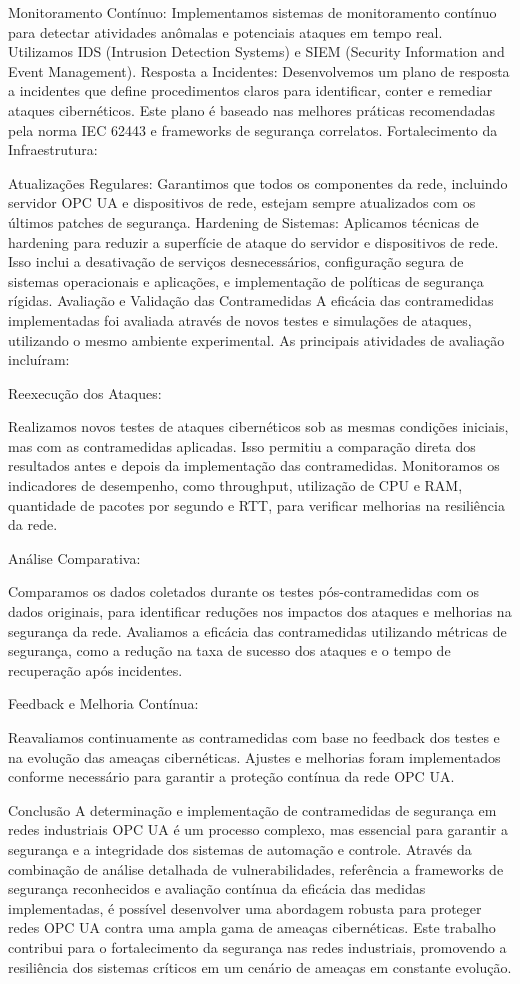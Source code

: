 {    Monitoramento Contínuo: Implementamos sistemas de monitoramento contínuo para detectar atividades anômalas e potenciais ataques em tempo real. Utilizamos IDS (Intrusion Detection Systems) e SIEM (Security Information and Event Management).
    Resposta a Incidentes: Desenvolvemos um plano de resposta a incidentes que define procedimentos claros para identificar, conter e remediar ataques cibernéticos. Este plano é baseado nas melhores práticas recomendadas pela norma IEC 62443 e frameworks de segurança correlatos.
    Fortalecimento da Infraestrutura:

    Atualizações Regulares: Garantimos que todos os componentes da rede, incluindo servidor OPC UA e dispositivos de rede, estejam sempre atualizados com os últimos patches de segurança.
    Hardening de Sistemas: Aplicamos técnicas de hardening para reduzir a superfície de ataque do servidor e dispositivos de rede. Isso inclui a desativação de serviços desnecessários, configuração segura de sistemas operacionais e aplicações, e implementação de políticas de segurança rígidas.
    Avaliação e Validação das Contramedidas
    A eficácia das contramedidas implementadas foi avaliada através de novos testes e simulações de ataques, utilizando o mesmo ambiente experimental. As principais atividades de avaliação incluíram:

    Reexecução dos Ataques:

    Realizamos novos testes de ataques cibernéticos sob as mesmas condições iniciais, mas com as contramedidas aplicadas. Isso permitiu a comparação direta dos resultados antes e depois da implementação das contramedidas. Monitoramos os indicadores de desempenho, como throughput, utilização de CPU e RAM, quantidade de pacotes por segundo e RTT, para verificar melhorias na resiliência da rede.

    Análise Comparativa:

    Comparamos os dados coletados durante os testes pós-contramedidas com os dados originais, para identificar reduções nos impactos dos ataques e melhorias na segurança da rede. Avaliamos a eficácia das contramedidas utilizando métricas de segurança, como a redução na taxa de sucesso dos ataques e o tempo de recuperação após incidentes.

    Feedback e Melhoria Contínua:

    Reavaliamos continuamente as contramedidas com base no feedback dos testes e na evolução das ameaças cibernéticas. Ajustes e melhorias foram implementados conforme necessário para garantir a proteção contínua da rede OPC UA.

    Conclusão
    A determinação e implementação de contramedidas de segurança em redes industriais OPC UA é um processo complexo, mas essencial para garantir a segurança e a integridade dos sistemas de automação e controle. Através da combinação de análise detalhada de vulnerabilidades, referência a frameworks de segurança reconhecidos e avaliação contínua da eficácia das medidas implementadas, é possível desenvolver uma abordagem robusta para proteger redes OPC UA contra uma ampla gama de ameaças cibernéticas. Este trabalho contribui para o fortalecimento da segurança nas redes industriais, promovendo a resiliência dos sistemas críticos em um cenário de ameaças em constante evolução.
    }
